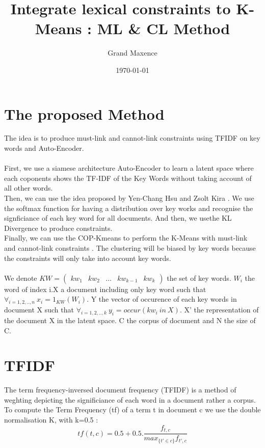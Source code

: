 \documentclass{article}
\title{Integrate lexical constraints to K-Means : ML \& CL Method}
\author{Grand Maxence}
\date{\today}
\begin{document}
\maketitle
\justify

\section{The proposed Method}

The idea is to produce must-link and cannot-link constraints using
TFIDF on key words and Auto-Encoder.\\ \\
First, we use a siamese architecture  Auto-Encoder to learn a latent
space where each coponents shows the TF-IDF of the Key Words without
taking account of all other words.\\Then, we can use the idea proposed
by Yen-Chang Hsu and Zsolt Kira \cite{2015arXiv151106321H}.
We use the softmax function for having a distribution over key works
and recognise the signficiance of each key word for all documents.
And then, we usethe KL Divergence to produce constraints.\\Finally,
we can use the COP-Kmeans to perform the K-Means with must-link and
cannot-link constraints \cite{Wagstaff:2001:CKC:645530.655669}.
The clustering will be biased by key words because the constraints
will only take into account key words.
\\ \\
We denote $KW = \begin{pmatrix} kw_1 & kw_2 & ... & kw_{k-1} & kw_{k}
\end {pmatrix}$
the set of key words. $W_i$ the word of index i.X a document including
only key word such that $\forall_{i = 1,2,..,n}~x_i = 1_{KW}(W_i)$.
Y the vector of occurence of each key words in document X such that
$\forall_{i=1, 2, .., k}~y_i = occur(kw_i~in~X)$. X' the representation of
the document X in the latent space. C the corpus of document and N the
size of C.

\section{TFIDF}

The term frequency-inversed document frequency (TFIDF) is a method of
weghting depicting the significiance of each word in a document rather
a corpus.
\\
To compute the Term Frequency (tf) of a term t in document c we use
the double normalisation K, with k=0.5 :  
\begin{equation}\label{eq:tf}
  tf(t, c) = 0.5 + 0.5.\frac{f_{t,c}}{max_{\{t' \in c \}}f_{t',c}}
\end{equation}
\end{document}

